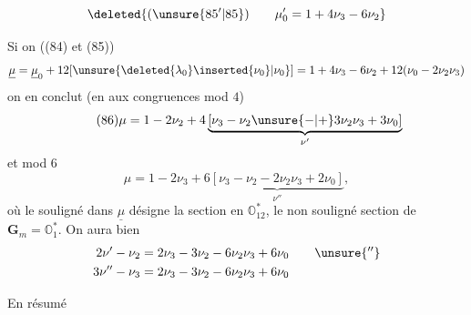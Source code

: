 \[
\deleted{(\unsure{85'|85})\qquad\mu'_0=1+4\nu_3-6\nu_2}
\]


Si on  ((84) et (85))
\[
\underline{\mu}=\underline{\mu}_0+12[\unsure{\deleted{\lambda_0}\inserted{\nu_0}|\nu_0}]
=1+4\nu_3-6\nu_2+12(\nu_0-2\nu_2\nu_3)
\]
on en conclut (en  aux congruences mod $4$)
\[
\tag{86}
\mu=1-2\nu_2+4\underbrace{[\nu_3-\nu_2\unsure{-|+}3\nu_2\nu_3+3\nu_0]}_{\nu'}
\]
et   mod $6$
\[
\tag{87}
\mu=1-2\nu_3+6\underbrace{[\nu_3-\nu_2-2\nu_2\nu_3+2\nu_0]}_{\nu''},
\]
où le souligné dans $\underline{\mu}$ désigne la section en $\mathbb O_{12}^*$, le non souligné \inserted{$\mu$}   section  de $\mathbf G_m=\mathbb O_1^*$. On aura bien
\[
\begin{aligned}
2\nu'-\nu_2&=2\nu_3-3\nu_2-6\nu_2\nu_3+6\nu_0\qquad\unsure{''}\\
3\nu''-\nu_3&=2\nu_3-3\nu_2-6\nu_2\nu_3+6\nu_0
\end{aligned}
\]

En résumé


